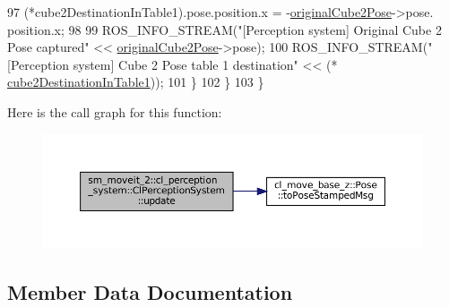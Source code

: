 \begin{DoxyCode}
97                 (*cube2DestinationInTable1).pose.position.x = -\hyperlink{classsm__moveit__2_1_1cl__perception__system_1_1ClPerceptionSystem_a8209f4f04c92db00f18da04327733e80}{originalCube2Pose}->pose.
      position.x;
98 
99                 ROS\_INFO\_STREAM(\textcolor{stringliteral}{"[Perception system] Original Cube 2 Pose captured"} << 
      \hyperlink{classsm__moveit__2_1_1cl__perception__system_1_1ClPerceptionSystem_a8209f4f04c92db00f18da04327733e80}{originalCube2Pose}->pose);
100                 ROS\_INFO\_STREAM(\textcolor{stringliteral}{"[Perception system] Cube 2 Pose table 1 destination"} << (*
      \hyperlink{classsm__moveit__2_1_1cl__perception__system_1_1ClPerceptionSystem_a6056364fa287555240bd5cbee19ae018}{cube2DestinationInTable1}));
101             \}
102         \}
103     \}
\end{DoxyCode}
Here is the call graph for this function\+:
\nopagebreak
\begin{figure}[H]
\begin{center}
\leavevmode
\includegraphics[width=350pt]{classsm__moveit__2_1_1cl__perception__system_1_1ClPerceptionSystem_a0efca38be333f667cc789dce522a72e3_cgraph}
\end{center}
\end{figure}


\subsection{Member Data Documentation}
\mbox{\label{classsm__moveit__2_1_1cl__perception__system_1_1ClPerceptionSystem_aa5593ed0d791969bb398168e505722a6}} 
